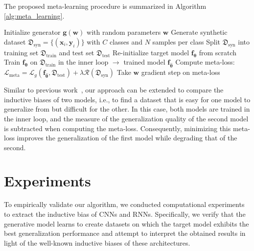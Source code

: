 \documentclass{article}
\begin{document}
The proposed meta-learning procedure is summarized in Algorithm \ref{alg:meta_learning}.

\begin{algorithm}[H]
\caption{Meta-learning for inductive bias extraction}
\label{alg:meta_learning}
\begin{algorithmic}[1]
\State Initialize generator $\mathbf{g}(\mathbf{w})$ with random parameters $\mathbf{w}$
    \State Generate synthetic dataset $\mathfrak{D}_{\text{syn}} = \{(\mathbf{x}_i, \mathbf{y}_i)\}$ with $C$ classes and $N$ samples per class
    \State Split $\mathfrak{D}_{\text{syn}}$ into training set $\mathfrak{D}_{\text{train}}$ and test set $\mathfrak{D}_{\text{test}}$
    \State Re-initialize target model $\mathbf{f}_{\boldsymbol{\theta}}$ from scratch
    \State Train $\mathbf{f}_{\boldsymbol{\theta}}$ on $\mathfrak{D}_{\text{train}}$ in the inner loop $\rightarrow$ trained model $\mathbf{f}_{\boldsymbol{\hat\theta}}$
    \State Compute meta-loss: $\mathcal{L}_{\text{meta}} = \mathcal{L}_g(\mathbf{f}_{\boldsymbol{\hat\theta}}, \mathfrak{D}_{\text{test}}) + \lambda \mathcal{R}(\mathfrak{D}_{\text{syn}})$
    \State Take $\mathbf{w}$ gradient step on meta-loss
\EndWhile
\end{algorithmic}
\end{algorithm}
Similar to previous work~\cite{dorrell2023metalearninginductivebiasessimple}, our approach can be extended to compare the inductive biases of two models, i.e., to find a dataset that is easy for one model to generalize from but difficult for the other. In this case, both models are trained in the inner loop, and the measure of the generalization quality of the second model is subtracted when computing the meta-loss. Consequently, minimizing this meta-loss improves the generalization of the first model while degrading that of the second.

\section{Experiments}\label{sec:exp}

To empirically validate our algorithm, we conducted computational experiments to extract the inductive bias of CNNs and RNNs. Specifically, we verify that the generative model learns to create datasets on which the target model exhibits the best generalization performance and attempt to interpret the obtained results in light of the well-known inductive biases of these architectures.
\end{document}
